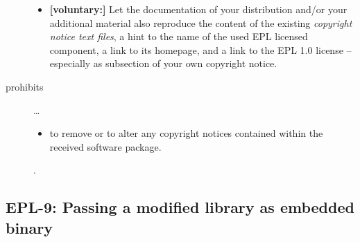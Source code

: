 \begin{description}
\begin{itemize}
  \item \textbf{[voluntary:]} Let the documentation of your distribution and/or
  your additional material also reproduce the content of the existing
  \emph{copyright notice text files}, a hint to the name of the used EPL
  licensed component, a link to its homepage, and a link to the EPL 1.0 license
  -- especially as subsection of your own copyright notice.
 
\end{itemize}

\item[prohibits] \ldots
\begin{itemize}
  \item to remove or to alter any copyright notices contained within the
  received software package.
\end{itemize}.

\end{description}


\subsection{EPL-9: Passing a modified library as embedded binary}

